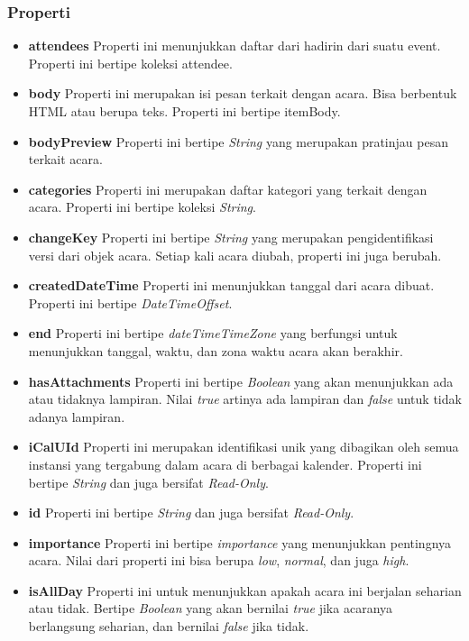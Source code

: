 \subsubsection{Properti}
\begin{itemize}
	\item \textbf{attendees}
	Properti ini menunjukkan daftar dari hadirin dari suatu event. Properti ini bertipe koleksi attendee. 
	\item \textbf{body}
	Properti ini merupakan isi pesan terkait dengan acara. Bisa berbentuk HTML atau berupa teks. Properti ini bertipe itemBody. 
	\item \textbf{bodyPreview}
	Properti ini bertipe \textit{String} yang merupakan pratinjau pesan terkait acara. 
	\item \textbf{categories}
	Properti ini merupakan daftar kategori yang terkait dengan acara. Properti ini bertipe koleksi \textit{String}.
	\item \textbf{changeKey}
	Properti ini bertipe \textit{String} yang merupakan pengidentifikasi versi dari objek acara. Setiap kali acara diubah, properti ini juga berubah. 
	\item \textbf{createdDateTime}
	Properti ini menunjukkan tanggal dari acara dibuat. Properti ini bertipe \textit{DateTimeOffset}. 
	\item \textbf{end}
	Properti ini bertipe \textit{dateTimeTimeZone} yang berfungsi untuk menunjukkan tanggal, waktu, dan zona waktu acara akan berakhir. 
	\item \textbf{hasAttachments}
	Properti ini bertipe \textit{Boolean} yang akan menunjukkan ada atau tidaknya lampiran. Nilai \textit{true} artinya ada lampiran dan \textit{false} untuk tidak adanya lampiran. 
	\item \textbf{iCalUId}
	Properti ini merupakan identifikasi unik yang dibagikan oleh semua instansi yang tergabung dalam acara di berbagai kalender. Properti ini bertipe \textit{String} dan juga bersifat \textit{Read-Only}. 
	\item \textbf{id}
	Properti ini bertipe \textit{String} dan juga bersifat \textit{Read-Only}.
	\item \textbf{importance}
	Properti ini bertipe \textit{importance} yang menunjukkan pentingnya acara. Nilai dari properti ini bisa berupa \textit{low}, \textit{normal}, dan juga \textit{high}. 
	\item \textbf{isAllDay}
	Properti ini untuk menunjukkan apakah acara ini berjalan seharian atau tidak. Bertipe \textit{Boolean} yang akan bernilai \textit{true} jika acaranya berlangsung seharian, dan bernilai \textit{false} jika tidak. 

\end{itemize}
